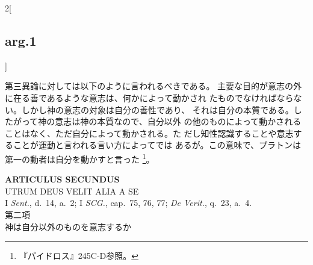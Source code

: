 \documentclass[paper=a4paper,fontsize=10pt,jafontsize=9pt,titlepage]{jlreq}
\begin{document}
\begin{paracol}{2}[\subsection{arg.1}]
\switchcolumn

第三異論に対しては以下のように言われるべきである。
 主要な目的が意志の外に在る善であるような意志は、何かによって動かされ
 たものでなければならない。しかし神の意志の対象は自分の善性であり、
 それは自分の本質である。したがって神の意志は神の本質なので、自分以外
 の他のものによって動かされることはなく、ただ自分によって動かされる。た
 だし知性認識することや意志することが運動と言われる言い方によってでは
 あるが。この意味で、プラトンは第一の動者は自分を動かすと言った
 \footnote{『パイドロス』245C-D参照。}。

\end{paracol}



\newpage


{}
\setcounter{section}{2}
\setcounter{subsection}{0}
\begin{center}
 {\Large {\bfseries ARTICULUS SECUNDUS}}\\
 {\large UTRUM DEUS VELIT ALIA A SE}\\
 {\footnotesize I {\itshape Sent.}, d.~14, a.~2; I {\itshape SCG.},
 cap.~75, 76, 77; {\itshape De Verit.}, q.~23, a.~4.}\\
 {\Large 第二項\\神は自分以外のものを意志するか}
\end{center}
\end{document}
